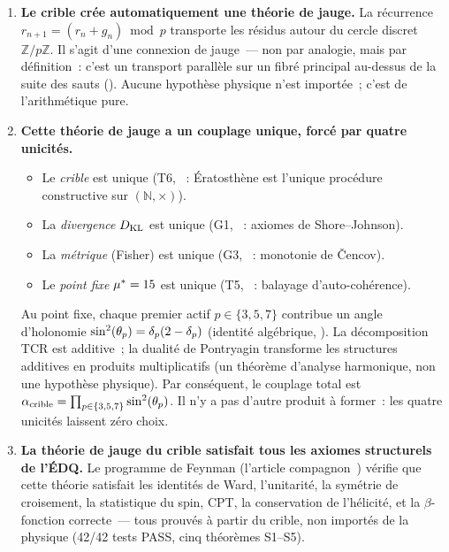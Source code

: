 \documentclass[12pt,a4paper]{article}
\begin{document}
\begin{tcolorbox}[colback=thmblue!5, colframe=thmblue!60, title={\textbf{L'argument en cinq étapes}}]
\begin{enumerate}[leftmargin=*, label=\textbf{\arabic*.}]
\item \textbf{Le crible crée automatiquement une théorie de jauge.}
  La récurrence $r_{n+1} = (r_n + g_n) \bmod p$ transporte les résidus
  autour du cercle discret $\mathbb{Z}/p\mathbb{Z}$. Il s'agit d'une
  connexion de jauge~--- non par analogie, mais par définition~: c'est
  un transport parallèle sur un fibré principal au-dessus de la suite
  des sauts (\cite{companion_M1}). Aucune hypothèse physique n'est
  importée~; c'est de l'arithmétique pure.

\item \textbf{Cette théorie de jauge a un couplage unique, forcé par quatre unicités.}
  \begin{itemize}[nosep]
  \item Le \emph{crible} est unique (T6, \cite{companion_M2}~:
    Ératosthène est l'unique procédure constructive sur
    $(\mathbb{N}, \times)$).
  \item La \emph{divergence} $D_{\mathrm{KL}}$ est unique (G1,
    \cite{companion_M2}~: axiomes de Shore--Johnson).
  \item La \emph{métrique} (Fisher) est unique (G3,
    \cite{companion_M2}~: monotonie de \v{C}encov).
  \item Le \emph{point fixe} ${\mu^{*}} = 15$ est unique (T5,
    \cite{companion_M3}~: balayage d'auto-cohérence).
  \end{itemize}
  Au point fixe, chaque premier actif $p \in \{3, 5, 7\}$ contribue
  un angle d'holonomie $\sin^2(\theta_{p}) = \delta_p(2 - \delta_p)$ (identité
  algébrique, \cite{companion_M2}). La décomposition TCR est
  additive~; la dualité de Pontryagin transforme les structures
  additives en produits multiplicatifs (un théorème d'analyse
  harmonique, non une hypothèse physique). Par conséquent, le
  couplage total est
  $\alpha_{\rm crible} = \prod_{p \in \{3,5,7\}} \sin^2(\theta_{p})$. Il n'y a
  pas d'autre produit à former~: les quatre unicités laissent zéro
  choix.

\item \textbf{La théorie de jauge du crible satisfait tous les axiomes structurels de l'ÉDQ.}
  Le programme de Feynman (l'article
  compagnon~\cite{companion_physics}) vérifie que cette théorie
  satisfait les identités de Ward, l'unitarité, la symétrie de
  croisement, la statistique du spin, CPT, la conservation de
  l'hélicité, et la $\beta$-fonction correcte~--- tous prouvés à
  partir du crible, non importés de la physique (42/42 tests PASS,
  cinq théorèmes S1--S5).


\end{enumerate}
\end{tcolorbox}
\end{document}
